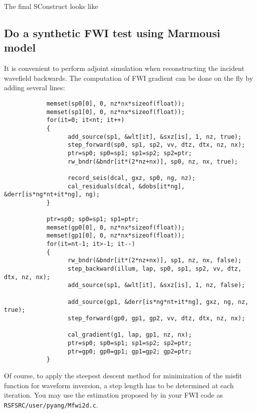 

The final SConstruct looks like


\subsection{Do a synthetic FWI test using Marmousi model}

It is convenient to perform adjoint simulation when reconstructing the incident wavefield backwards. The computation of FWI gradient can be done on the fly by adding several lines:
\begin{verbatim} 
			memset(sp0[0], 0, nz*nx*sizeof(float));
			memset(sp1[0], 0, nz*nx*sizeof(float));
			for(it=0; it<nt; it++)
			{
				  add_source(sp1, &wlt[it], &sxz[is], 1, nz, true);			
				  step_forward(sp0, sp1, sp2, vv, dtz, dtx, nz, nx);
				  ptr=sp0; sp0=sp1; sp1=sp2; sp2=ptr;
				  rw_bndr(&bndr[it*(2*nz+nx)], sp0, nz, nx, true);

				  record_seis(dcal, gxz, sp0, ng, nz);
				  cal_residuals(dcal, &dobs[it*ng], &derr[is*ng*nt+it*ng], ng);
			}

			ptr=sp0; sp0=sp1; sp1=ptr;
			memset(gp0[0], 0, nz*nx*sizeof(float));
			memset(gp1[0], 0, nz*nx*sizeof(float));
			for(it=nt-1; it>-1; it--)
			{
				  rw_bndr(&bndr[it*(2*nz+nx)], sp1, nz, nx, false);
				  step_backward(illum, lap, sp0, sp1, sp2, vv, dtz, dtx, nz, nx);
				  add_source(sp1, &wlt[it], &sxz[is], 1, nz, false);

				  add_source(gp1, &derr[is*ng*nt+it*ng], gxz, ng, nz, true);
				  step_forward(gp0, gp1, gp2, vv, dtz, dtx, nz, nx);

				  cal_gradient(g1, lap, gp1, nz, nx);
				  ptr=sp0; sp0=sp1; sp1=sp2; sp2=ptr;
				  ptr=gp0; gp0=gp1; gp1=gp2; gp2=ptr;
			}
\end{verbatim}
Of course, to apply the steepest descent method for minimization of the misfit function for waveform inversion, a step length has to be determined at each iteration. You may use the estimation proposed by \citet[in the appendix]{Pica_1990_NIS} in your FWI code as \texttt{RSFSRC/user/pyang/Mfwi2d.c}. 



